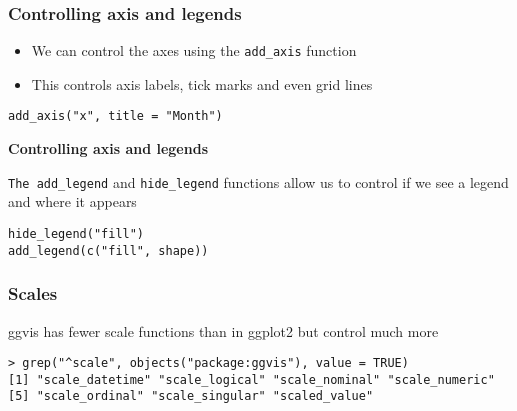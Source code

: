 \documentclass[MASTER.tex]{subfiles}
\begin{document}
 
	

\begin{frame}[fragile]
\frametitle{Controlling axis and legends}
\Large
\begin{itemize}
\item We can control the axes using the \texttt{add\_axis}
function
\item This controls axis labels, tick marks and even grid
lines
\end{itemize}

\begin{framed}
	\begin{verbatim}
add_axis("x", title = "Month")
\end{verbatim}
\end{framed}

\end{frame}
\begin{frame}[fragile]
\textbf{Controlling axis and legends}
\Large

\texttt{The add\_legend} and \texttt{hide\_legend} functions allow
us to control if we see a legend and where it
appears

\begin{framed}
\begin{verbatim}
hide_legend("fill")
add_legend(c("fill", shape))
\end{verbatim}
\end{framed}
\end{frame}
\begin{frame}[fragile]
\frametitle{Scales}
\Large
ggvis has fewer scale functions than in ggplot2
but control much more

\begin{framed}
\begin{verbatim}
> grep("^scale", objects("package:ggvis"), value = TRUE)
[1] "scale_datetime" "scale_logical" "scale_nominal" "scale_numeric"
[5] "scale_ordinal" "scale_singular" "scaled_value" 
\end{verbatim}
\end{framed}

\end{frame}
\end{document}
